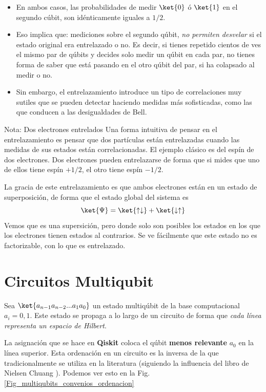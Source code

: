 \documentclass[a4paper,11pt]{book} %
\numberwithin{equation}{chapter}
\begin{document}
\begin{itemize}
	\item En ambos casos,  las probabilidades de medir $\ket{0}$ ó $\ket{1}$ en el segundo cúbit, son idénticamente iguales a $1/2$.
	
	\item Eso implica que: mediciones sobre el segundo qúbit, \textit{no permiten desvelar} si el estado original era entrelazado o no. Es decir, si tienes repetido cientos de ves el mismo par de qúbits y decides solo medir un qúbit en cada par, no tienes forma de saber que está pasando en el otro qúbit del par, si ha colapsado al medir o no.
	
	\item Sin embargo, el entrelazamiento introduce un tipo de correlaciones muy sutiles que se pueden detectar haciendo medidas más sofisticadas, como las que conducen a las desigualdades de Bell. 
\end{itemize}


	\begin{mybox_blue}{Nota: Dos electrones entrelados}
	Una forma intuitiva de pensar en el entrelazamiento es pensar que dos partículas están entrelazadas cuando las medidas de sus estados están correlacionadas. El ejemplo clásico es del espín de dos electrones. Dos electrones pueden entrelazarse de forma que si mides que uno de ellos tiene espín $+1/2$, el otro tiene espín $-1/2$. 

	\vspace{0.3cm}
La gracia de este entrelazamiento es que ambos electrones están en un estado de superposición, de forma que el estado global del sistema es
$$
\ket{\Psi} = \ket{\uparrow \downarrow} + \ket{\downarrow\uparrow}
$$
Vemos que es una supersición, pero donde solo son posibles los estados en los que los electrones tienen estados al contrarios. Se ve fácilmente que este estado no es factorizable, con lo que es entrelazado. 
	\end{mybox_blue}



    \section{Circuitos Multiqubit}

Sea $\ket{a_{n-1}a_{n-2}...a_1a_0}$ un estado multiqúbit de la base computacional $a_{i} = 0,1$. Este estado se propaga a lo largo de un circuito de forma que \textit{cada línea representa un espacio de Hilbert}. 

La asignación que se hace en \textbf{Qiskit }coloca el qúbit \textbf{menos relevante }$a_0$  en la  línea superior. Esta ordenación en un circuito es la inversa de la que tradicionalmente se utiliza en la literatura (siguiendo la influencia del libro de Nielsen Chuang \cite{nielsen_chuang_2010}). Podemos ver esto en la Fig. \ref{Fig_multiqubits_convenios_ordenacion}
\end{document}
